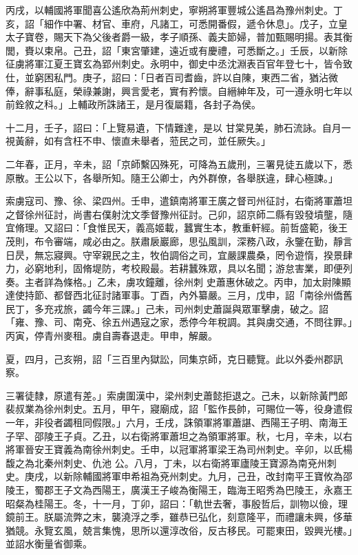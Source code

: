 \begin{pinyinscope}
 丙戌，以輔國將軍聞喜公遙欣為荊州刺史，寧朔將軍豐城公遙昌為豫州刺史。丁亥，詔「細作中署、材官、車府，凡諸工，可悉開番假，遞令休息」。戊子，立皇太子寶卷，賜天下為父後者爵一級，孝子順孫、義夫節婦，普加甄賜明揚。表其衡閭，賚以束帛。己丑，詔「東宮肇建，遠近或有慶禮，可悉斷之。」壬辰，以新除征虜將軍江夏王寶玄為郢州刺史。永明中，御史中丞沈淵表百官年登七十，皆令致仕，並窮困私門。庚子，詔曰：「日者百司耆齒，許以自陳，東西二省，猶沾微俸，辭事私庭，榮祿兼謝，興言愛老，實有矜懷。自縉紳年及，可一遵永明七年以前銓敘之科。」上輔政所誅諸王，是月復屬籍，各封子為侯。



 十二月，壬子，詔曰：「上覽易遺，下情難達，是以
 甘棠見美，肺石流詠。自月一視黃辭，如有含枉不申、懷直未舉者，蒞民之司，並任厥失。」



 二年春，正月，辛未，詔「京師繫囚殊死，可降為五歲刑，三署見徒五歲以下，悉原散。王公以下，各舉所知。隨王公卿士，內外群僚，各舉朕違，肆心極諫。」



 索虜寇司、豫、徐、梁四州。壬申，遣鎮南將軍王廣之督司州征討，右衛將軍蕭坦之督徐州征討，尚書右僕射沈文季督豫州征討。己卯，詔京師二縣有毀發墳壟，隨宜脩理。又詔曰：「食惟民天，義高姬載，蠶實生本，教重軒經。前哲盛範，後王茂則，布令審端，咸必由之。朕肅扆巖廊，思弘風訓，深務八政，永鑒在勤，靜言日昃，無忘寢興。守宰親民之主，牧伯調俗之司，宜嚴課農桑，罔令遊惰，揆景肆力，必窮地利，固脩堤防，考校殿最。若耕蠶殊眾，具以名聞；游怠害業，即便列奏。主者詳為條格。」乙未，虜攻鐘離，徐州刺
 史蕭惠休破之。丙申，加太尉陳顯達使持節、都督西北征討諸軍事。丁酉，內外纂嚴。三月，戊申，詔「南徐州僑舊民丁，多充戎旅，蠲今年三課。」己未，司州刺史蕭誕與眾軍擊虜，破之。詔「雍、豫、司、南兗、徐五州遇寇之家，悉停今年稅調。其與虜交通，不問往罪。」丙寅，停青州麥租。虜自壽春退走。甲申，解嚴。



 夏，四月，己亥朔，詔「三百里內獄訟，同集京師，克日聽覽。此以外委州郡訊察。



 三署徒隸，原遣有差。」索虜圍漢中，梁州刺史蕭懿拒退之。己未，以新除黃門郎裴叔業為徐州刺史。五月，甲午，寢廟成，詔「監作長帥，可賜位一等，役身遣假一年，非役者蠲租同假限。」六月，壬戌，誅領軍將軍蕭諶、西陽王子明、南海王子罕、邵陵王子貞。乙丑，以右衛將軍蕭坦之為領軍將軍。秋，七月，辛未，以右將軍晉安王寶義為南徐州刺史。壬申，以冠軍將軍梁王為司州刺史。辛卯，以氐楊馥之為北秦州刺史、仇池
 公。八月，丁未，以右衛將軍廬陵王寶源為南兗州刺史。庚戌，以新除輔國將軍申希祖為兗州刺史。九月，己丑，改封南平王寶攸為邵陵王，蜀郡王子文為西陽王，廣漢王子峻為衡陽王，臨海王昭秀為巴陵王，永嘉王昭粲為桂陽王。冬，十一月，丁卯，詔曰：「軌世去奢，事殷哲后，訓物以儉，理鏡前王。朕屬流弊之末，襲澆浮之季，雖恭已弘化，刻意隆平，而禮讓未興，侈華猶競。永覽玄風，兢言集愧，思所以還淳改俗，反古移民。可罷東田，毀興光樓。」並詔水衡量省御乘。




\end{pinyinscope}
